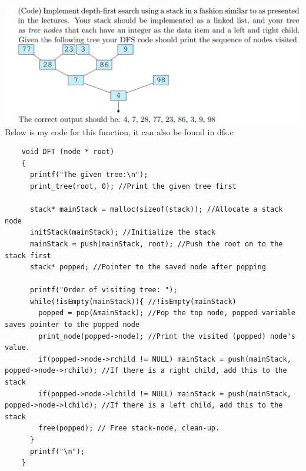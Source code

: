 \documentclass{article}
\begin{document}
\section{}
\includegraphics[width=\linewidth, keepaspectratio=true]{task4}
Below is my code for this function, it can also be found in dfs.c
\begin{lstlisting}
    void DFT (node * root)
    {
      printf("The given tree:\n");
      print_tree(root, 0); //Print the given tree first
    
      stack* mainStack = malloc(sizeof(stack)); //Allocate a stack node
      initStack(mainStack); //Initialize the stack
      mainStack = push(mainStack, root); //Push the root on to the stack first
      stack* popped; //Pointer to the saved node after popping
    
      printf("Order of visiting tree: ");
      while(!isEmpty(mainStack)){ //!isEmpty(mainStack)
        popped = pop(&mainStack); //Pop the top node, popped variable saves pointer to the popped node
        print_node(popped->node); //Print the visited (popped) node's value.
        if(popped->node->rchild != NULL) mainStack = push(mainStack, popped->node->rchild); //If there is a right child, add this to the stack
        if(popped->node->lchild != NULL) mainStack = push(mainStack, popped->node->lchild); //If there is a left child, add this to the stack
        free(popped); // Free stack-node, clean-up.
      }
      printf("\n");
    }
\end{lstlisting}


\vspace{2pt}
\end{document}
